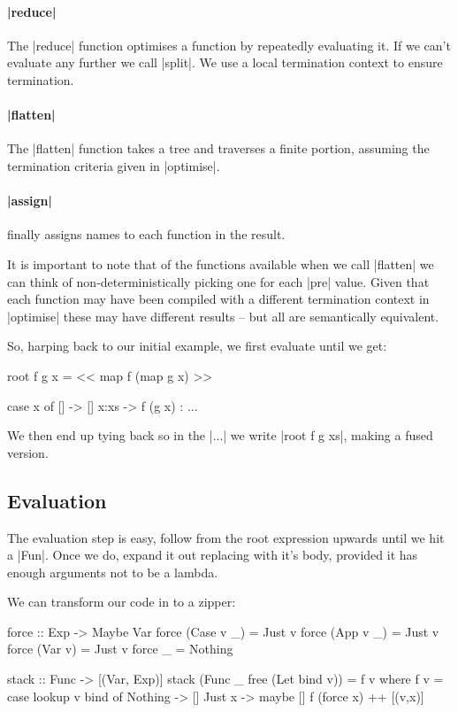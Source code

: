 \documentclass{sigplanconf}
\begin{document}
\paragraph{|reduce|} The |reduce| function optimises a function by repeatedly evaluating it. If we can't evaluate any further we call |split|. We use a local termination context to ensure termination.

\paragraph{|flatten|} The |flatten| function takes a tree and traverses a finite portion, assuming the termination criteria given in |optimise|.

\paragraph{|assign|} finally assigns names to each function in the result.

It is important to note that of the functions available when we call |flatten| we can think of non-deterministically picking one for each |pre| value. Given that each function may have been compiled with a different termination context in |optimise| these may have different results -- but all are semantically equivalent.

So, harping back to our initial example, we first evaluate until we get:

\begin{code}
root f g x = << map f (map g x) >>
\end{code}


\begin{code}
case x of
   [] -> []
   x:xs -> f (g x) : ...
\end{code}

We then end up tying back so in the |...| we write |root f g xs|, making a fused version.

\subsection{Evaluation}
\label{sec:eval}

The evaluation step is easy, follow from the root expression upwards until we hit a |Fun|. Once we do, expand it out replacing with it's body, provided it has enough arguments not to be a lambda.

We can transform our code in to a zipper:

\begin{code}
force :: Exp -> Maybe Var
force (Case v _) = Just v
force (App v _) = Just v
force (Var v) = Just v
force _ = Nothing

stack :: Func -> [(Var, Exp)]
stack (Func _ free (Let bind v)) = f v
    where f v = case lookup v bind of
                     Nothing -> []
                     Just x -> maybe [] f (force x) ++ [(v,x)]
\end{code}
\end{document}
